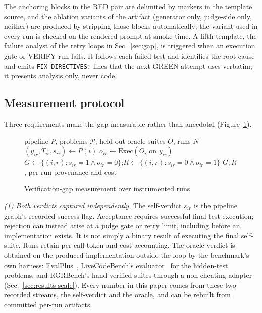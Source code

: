 The anchoring blocks in the RED pair are delimited by markers in the template source, and the
ablation variants of the artifact (generator only, judge-side only, neither) are produced by
stripping those blocks automatically; the variant used in every run is checked on the rendered prompt
at smoke time. A fifth template, the failure analyst of the retry loops in Sec.~\ref{sec:gap},
is triggered when an execution gate or VERIFY run fails. It follows each failed test and identifies the
root cause and emits \texttt{FIX DIRECTIVES:} lines that the next GREEN attempt uses
verbatim; it presents analysis only, never code.

\subsection{Measurement protocol}
\label{sec:protocol}

Three requirements make the gap measurable rather than anecdotal (Figure~\ref{alg:audit}).

\begin{figure}[t]
\caption{Verification-gap measurement over instrumented runs}
\label{alg:audit}
\begin{algorithmic}[1]
\Require pipeline $P$, problems $\mathcal{P}$, held-out oracle suites $O$, runs $N$
  \State $(y_{ir}, T_{ir}, s_{ir}) \gets P(i)$ 
  \State $o_{ir} \gets \mathrm{Exec}(O_i \text{ on } y_{ir})$ 
\EndFor
\State $G \gets \{ (i,r) : s_{ir}{=}1 \wedge o_{ir}{=}0 \}$;\quad $R \gets \{ (i,r) : s_{ir}{=}0 \wedge o_{ir}{=}1 \}$
\State \Return $G, R$, per-run provenance and cost
\end{algorithmic}
\end{figure}

\emph{(1) Both verdicts captured independently.} The self-verdict $s_{ir}$ is the pipeline
graph's recorded success flag. Acceptance requires successful final test execution; rejection
can instead arise at a judge gate or retry limit, including before an implementation exists.
It is not simply a binary result of executing the final self-suite. Runs retain per-call
token and cost accounting. The
oracle verdict is obtained on the produced implementation outside the loop by the benchmark's own
harness: EvalPlus~\cite{liu2023evalplus}, LiveCodeBench's evaluator~\cite{jain2024livecodebench}
for the hidden-test problems, and RGRBench's hand-verified suites through a non-cheating adapter
(Sec.~\ref{sec:results-scale}). Every number in this paper comes from these two recorded
streams, the self-verdict and the oracle, and can be rebuilt from committed per-run artifacts.

